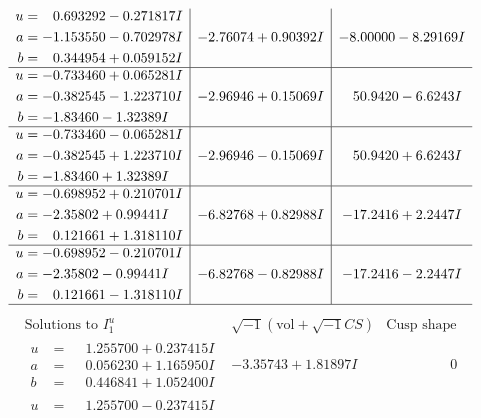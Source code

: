 \documentclass[1p]{elsarticle_modified}
\theoremstyle{definition}
\newcommand{\I}{\sqrt{-1}}
\begin{document}
$$\begin{array}{c|c|c}
\begin{aligned}
u &= \phantom{-}0.693292 - 0.271817 I \\
a &= -1.153550 - 0.702978 I \\
b &= \phantom{-}0.344954 + 0.059152 I\end{aligned}
 & -2.76074 + 0.90392 I & -8.00000 - 8.29169 I \\ \hline\begin{aligned}
u &= -0.733460 + 0.065281 I \\
a &= -0.382545 - 1.223710 I \\
b &= -1.83460 - 1.32389 I\end{aligned}
 & -2.96946 + 0.15069 I & \phantom{-}50.9420 - 6.6243 I \\ \hline\begin{aligned}
u &= -0.733460 - 0.065281 I \\
a &= -0.382545 + 1.223710 I \\
b &= -1.83460 + 1.32389 I\end{aligned}
 & -2.96946 - 0.15069 I & \phantom{-}50.9420 + 6.6243 I \\ \hline\begin{aligned}
u &= -0.698952 + 0.210701 I \\
a &= -2.35802 + 0.99441 I \\
b &= \phantom{-}0.121661 + 1.318110 I\end{aligned}
 & -6.82768 + 0.82988 I & -17.2416 + 2.2447 I \\ \hline\begin{aligned}
u &= -0.698952 - 0.210701 I \\
a &= -2.35802 - 0.99441 I \\
b &= \phantom{-}0.121661 - 1.318110 I\end{aligned}
 & -6.82768 - 0.82988 I & -17.2416 - 2.2447 I\\
 \hline 
 \end{array}$$\newpage$$\begin{array}{c|c|c}  
\text{Solutions to }I^u_{1}& \I (\text{vol} + \sqrt{-1}CS) & \text{Cusp shape}\\
 \hline 
\begin{aligned}
u &= \phantom{-}1.255700 + 0.237415 I \\
a &= \phantom{-}0.056230 + 1.165950 I \\
b &= \phantom{-}0.446841 + 1.052400 I\end{aligned}
 & -3.35743 + 1.81897 I & \phantom{-0.000000 } 0 \\ \hline\begin{aligned}
u &= \phantom{-}1.255700 - 0.237415 I \\

\end{aligned}
\end{array}$$
\end{document}
